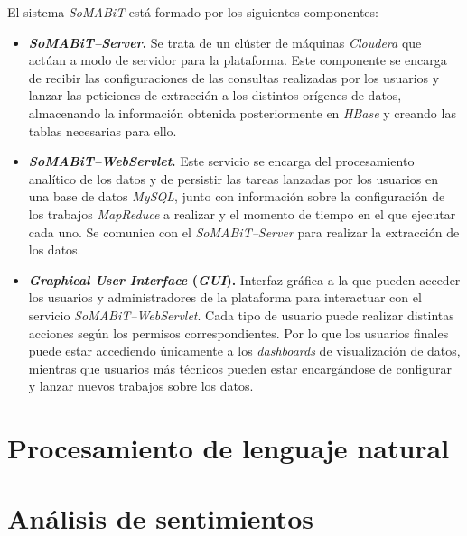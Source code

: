 
El sistema \textit{SoMABiT} está formado por los siguientes componentes:

\begin{itemize}
    \item \textbf{\textit{SoMABiT--Server}.} Se trata de un clúster de máquinas \textit{Cloudera} que actúan a modo de servidor para la plataforma. Este componente se encarga de recibir las configuraciones de las consultas realizadas por los usuarios y lanzar las peticiones de extracción a los distintos orígenes de datos, almacenando la información obtenida posteriormente en \textit{HBase} y creando las tablas necesarias para ello.

    \item \textbf{\textit{SoMABiT--WebServlet}.} Este servicio se encarga del procesamiento analítico de los datos y de persistir las tareas lanzadas por los usuarios en una base de datos \textit{MySQL}, junto con información sobre la configuración de los trabajos \textit{MapReduce} a realizar y el momento de tiempo en el que ejecutar cada uno. Se comunica con el \textit{SoMABiT--Server} para realizar la extracción de los datos.

    \item \textbf{\textit{Graphical User Interface} (\textit{GUI}).} Interfaz gráfica a la que pueden acceder los usuarios y administradores de la plataforma para interactuar con el servicio \textit{SoMABiT--WebServlet}. Cada tipo de usuario puede realizar distintas acciones según los permisos correspondientes. Por lo que los usuarios finales puede estar accediendo únicamente a los \textit{dashboards} de visualización de datos, mientras que usuarios más técnicos pueden estar encargándose de configurar y lanzar nuevos trabajos sobre los datos.
\end{itemize}

\section{Procesamiento de lenguaje natural}

\section{Análisis de sentimientos}